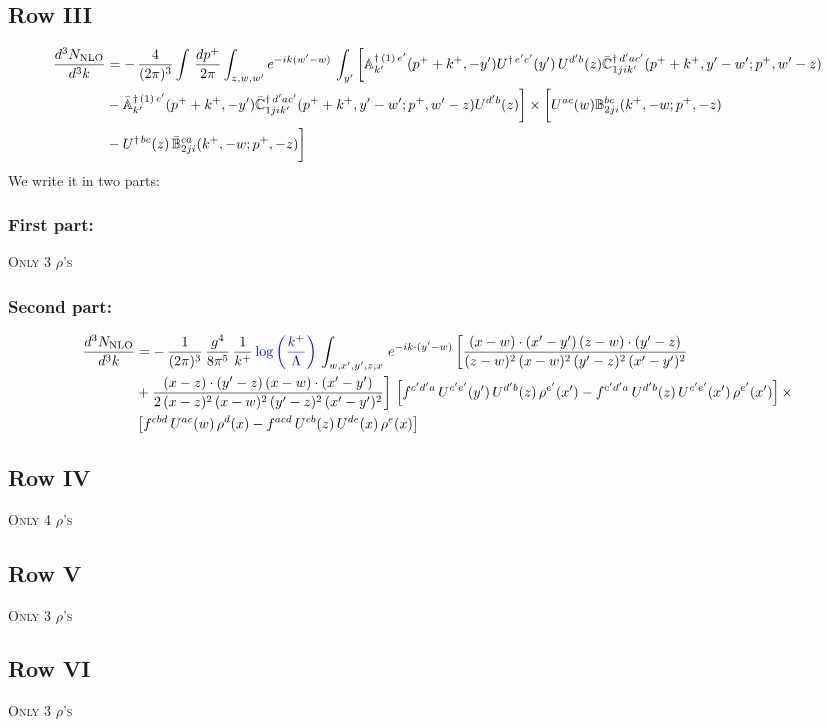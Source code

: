 \documentclass[9pt]{article}
\def\mf#1{\mathbb{#1}}
\numberwithin{equation}{section}
\begin{document}
 \subsection{Row III}
 \begin{align}
    \frac{d^{3}N_{\rm NLO}}{d^{3}k} & =   -\,\frac{4}{(2\pi)^{3}} \int\, \frac{dp^{+}}{2\pi}\int_{z,w,w^{\prime}} e^{-ik(w^{\prime}-w)}\,\int_{y^{\prime}}\bigg[\mf{A}^{\dagger\, (1)\,e^{\prime}}_{k^{\prime}}(p^{+}+k^{+},-y^{\prime})U^{\dagger\, e^{\prime}c^{\prime}}(y^{\prime})\,U^{d^{\prime}b}(z) \Bar{\mf{C}}^{\dagger\, d^{\prime}ac^{\prime}}_{1jik^{\prime}}(p^{+}+k^{+},y^{\prime}-w^{\prime}; p^{+},w^{\prime}-z)\notag \\ &  -\Bar{\mf{A}}^{\dagger\, (1)\,c^{\prime}}_{k^{\prime}}(p^{+}+k^{+},-y^{\prime}) \Bar{\mf{C}}^{\dagger\, d^{\prime}ac^{\prime}}_{1jik^{\prime}}(p^{+}+k^{+},y^{\prime}-w^{\prime}; p^{+},w^{\prime}-z)U^{d^{\prime}b}(z)\bigg] \times \bigg[U^{ac}(w) \mf{B}^{bc}_{2ji}(k^{+},-w;p^{+},-z)\notag \\ &  -U^{\dagger\, bc}(z)\,\Bar{\mf{B}}^{ca}_{2ji}(k^{+},-w; p^{+},-z)\bigg]\nonumber
\end{align}
We write it in two parts:
\subsubsection{First part:}
\textsc{Only 3 $\rho$'s}
\subsubsection{Second part:}
\begin{align}
 \frac{d^{3}N_{\rm NLO}}{d^{3}k} & =  -\, \frac{1}{(2\pi)^{3}}\,\frac{g^{4}}{8\pi^{5}}\,\frac{1}{k^{+}}\,{\color{blue}\log{\left(\frac{k^{+}}{\Lambda}\right)}}\,\int_{w,x',y',z,x}\, e^{-ik\cdot (y'-w)}\,\bigg[\frac{(x-w)\cdot (x'-y')\,(z-w)\cdot (y'-z)}{(z-w)^{2}\,(x-w)^{2}\,(y'-z)^{2}\,(x'-y')^{2}}\notag \\ & +\frac{(x-z)\cdot (y'-z)\,(x-w)\cdot (x'-y')}{2\,(x-z)^{2}\,(x-w)^{2}\,(y'-z)^{2}\,(x'-y')^{2}}\bigg]\, \left[f^{c'd'a}\,U^{c'e'}(y')\,U^{d'b}(z)\,\rho^{e'}(x')-f^{c'd'a}\, 
    U^{d'b}(z)\,U^{c'e'}(x')\,\rho^{e'}(x')\right]\times\notag \\ &  \left[f^{cbd}\,U^{ac}(w)\,\rho^{d}(x) -f^{acd}\,U^{cb}(z)\,U^{de}(x)\,\rho^{e}(x)\right] 
\end{align}
\subsection{Row IV}
\textsc{Only 4 $\rho$'s}
\subsection{Row V}
\textsc{Only 3 $\rho$'s}
\subsection{Row VI}
\textsc{Only 3 $\rho$'s}
\end{document}
